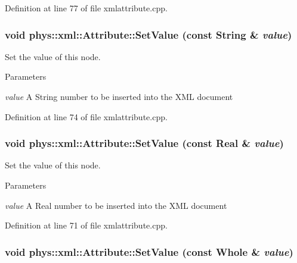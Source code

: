 Definition at line 77 of file xmlattribute.cpp.

\hypertarget{classphys_1_1xml_1_1Attribute_ad06e8d677bfa76d43936bd97ac3e62ef}{
\subsubsection[{SetValue}]{\setlength{\rightskip}{0pt plus 5cm}void phys::xml::Attribute::SetValue (const {\bf String} \& {\em value})}}
\label{da/ddf/classphys_1_1xml_1_1Attribute_ad06e8d677bfa76d43936bd97ac3e62ef}


Set the value of this node. 


\begin{DoxyParams}{Parameters}
\item[{\em value}]A String number to be inserted into the XML document \end{DoxyParams}


Definition at line 74 of file xmlattribute.cpp.

\hypertarget{classphys_1_1xml_1_1Attribute_ad2ba3ccf96388f0c859bc90e45ed94ab}{
\subsubsection[{SetValue}]{\setlength{\rightskip}{0pt plus 5cm}void phys::xml::Attribute::SetValue (const {\bf Real} \& {\em value})}}
\label{da/ddf/classphys_1_1xml_1_1Attribute_ad2ba3ccf96388f0c859bc90e45ed94ab}


Set the value of this node. 


\begin{DoxyParams}{Parameters}
\item[{\em value}]A Real number to be inserted into the XML document \end{DoxyParams}


Definition at line 71 of file xmlattribute.cpp.

\hypertarget{classphys_1_1xml_1_1Attribute_a45b441e83fb3c6e0cc911019b61039ba}{
\subsubsection[{SetValue}]{\setlength{\rightskip}{0pt plus 5cm}void phys::xml::Attribute::SetValue (const {\bf Whole} \& {\em value})}}
\label{da/ddf/classphys_1_1xml_1_1Attribute_a45b441e83fb3c6e0cc911019b61039ba}



